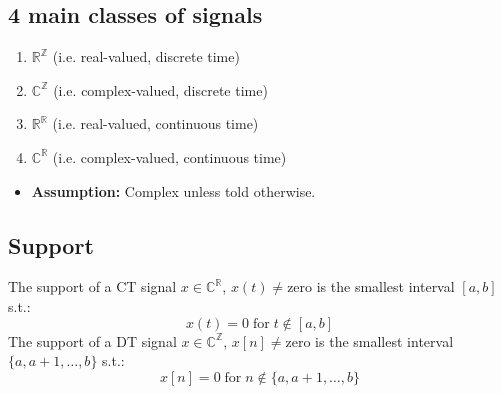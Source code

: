 \subsection{4 main classes of signals}
\begin{definition}
    \begin{enumerate}
        \item $\mathbb{R}^\mathbb{Z}$ (i.e. real-valued, discrete time)
        \item $\mathbb{C}^\mathbb{Z}$ (i.e. complex-valued, discrete time)
        \item $\mathbb{R}^\mathbb{R}$ (i.e. real-valued, continuous time)
        \item $\mathbb{C}^\mathbb{R}$ (i.e. complex-valued, continuous time)
    \end{enumerate}

    \begin{itemize}
        \item \textbf{Assumption:} Complex unless told otherwise.
    \end{itemize}
\end{definition}

\subsection{Support}
\begin{definition}
    The support of a CT signal \( x \in \mathbb{C}^{\mathbb{R}} \), $x(t) \neq \text{zero}$ is the smallest interval $[a,b]$ s.t.:
    \[
    x(t) = 0 \; \text{for} \; t \notin [a, b] 
    \]
    The support of a DT signal \( x \in \mathbb{C}^{\mathbb{Z}} \), $x[n] \neq \text{zero}$ is the smallest interval $\{a,a+1,\ldots,b\}$ s.t.:
    \[
    x[n] = 0 \; \text{for} \; n \notin \{a, a+1,\ldots,b\} 
    \]
\end{definition}


